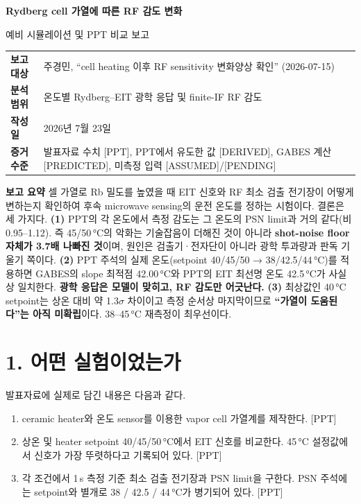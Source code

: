 \documentclass[10pt,a4paper]{article}
\newcommand{\Status}[1]{\textsf{\footnotesize[#1]}}
\newcommand{\summarybox}[1]{%
  \noindent\colorbox{pale}{%
    \parbox{\dimexpr\textwidth-2\fboxsep\relax}{#1}}}
\providecommand{\SlopeOptimumTemperatureC}{42.00}
\begin{document}
{\color{navy}\LARGE\bfseries Rydberg cell 가열에 따른 RF 감도 변화\par}
\vspace{2pt}
{\large 예비 시뮬레이션 및 PPT 비교 보고}

\vspace{0.5em}
\begin{tabularx}{\textwidth}{>{\bfseries}p{2.6cm}X}
보고 대상 & 주경민, ``cell heating 이후 RF sensitivity 변화양상 확인'' (2026-07-15)\\
분석 범위 & 온도별 Rydberg--EIT 광학 응답 및 finite-IF RF 감도\\
작성일 & 2026년 7월 23일\\
증거 수준 & 발표자료 수치 \Status{PPT}, PPT에서 유도한 값 \Status{DERIVED}, GABES 계산 \Status{PREDICTED}, 미측정 입력 \Status{ASSUMED}/\Status{PENDING}\\
\end{tabularx}

\vspace{0.4em}
\summarybox{%
\textbf{\color{navy}보고 요약}\quad
셀 가열로 Rb 밀도를 높였을 때 EIT 신호와 RF 최소 검출 전기장이 어떻게 변하는지 확인하여
후속 microwave sensing의 운전 온도를 정하는 시험이다. 결론은 세 가지다.
\textbf{(1)} PPT의 각 온도에서 측정 감도는 그 온도의 PSN limit과 거의 같다(비 0.95--1.12).
즉 45/50\,°C의 악화는 기술잡음이 더해진 것이 아니라 \textbf{shot-noise floor 자체가 3.7배 나빠진 것}이며,
원인은 검출기·전자단이 아니라 광학 투과량과 판독 기울기 쪽이다.
\textbf{(2)} PPT 주석의 실제 온도(setpoint 40/45/50 → 38/42.5/44\,°C)를 적용하면
GABES의 slope 최적점 \SlopeOptimumTemperatureC\,°C와 PPT의 EIT 최선명 온도 42.5\,°C가 사실상 일치한다.
\textbf{광학 응답은 모델이 맞히고, RF 감도만 어긋난다.}
\textbf{(3)} 최상값인 40\,°C setpoint는 상온 대비 약 1.3$\sigma$ 차이이고 측정 순서상 마지막이므로
\textbf{``가열이 도움된다''는 아직 미확립}이다. 38--45\,°C 재측정이 최우선이다.}

\section*{1. 어떤 실험이었는가}

발표자료에 실제로 담긴 내용은 다음과 같다.

\begin{enumerate}
  \setlength{\itemsep}{0.15em}
  \item ceramic heater와 온도 sensor를 이용한 vapor cell 가열계를 제작한다. \Status{PPT}
  \item 상온 및 heater setpoint 40/45/50\,°C에서 EIT 신호를 비교한다. 45\,°C 설정값에서
        신호가 가장 뚜렷하다고 기록되어 있다. \Status{PPT}
  \item 각 조건에서 1\,s 측정 기준 최소 검출 전기장과 PSN limit을 구한다. PSN 주석에는
        setpoint와 별개로 38 / 42.5 / 44\,°C가 병기되어 있다. \Status{PPT}
\end{enumerate}
\end{document}
